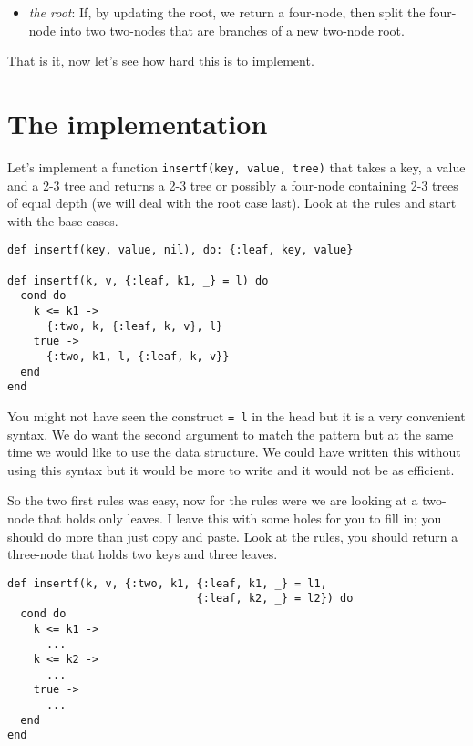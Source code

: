 \documentclass[a4paper,11pt]{article}
\begin{document}
\begin{itemize}
    \item {\em the root}: If, by updating the root, we return a four-node,
    then split the four-node into two two-nodes that are branches of a
    new two-node root.
\end{itemize}

That is it, now let's see how hard this is to implement.



\section{The implementation}

Let's implement a function {\tt insertf(key, value, tree)} that takes a
key, a value and a 2-3 tree and returns a 2-3 tree or possibly a
four-node containing 2-3 trees of equal depth (we will deal with the
root case last). Look at the rules and start with the base cases.

\begin{verbatim}
def insertf(key, value, nil), do: {:leaf, key, value}

def insertf(k, v, {:leaf, k1, _} = l) do
  cond do
    k <= k1 ->
      {:two, k, {:leaf, k, v}, l}
    true ->
      {:two, k1, l, {:leaf, k, v}}
  end
end
\end{verbatim}

You might not have seen the construct {\tt = l} in the head but it is a
very convenient syntax. We do want the second argument to match the
pattern but at the same time we would like to use the data
structure. We could have written this without using this syntax but it
would be more to write and it would not be as efficient.

So the two first rules was easy, now for the rules were we are looking
at a two-node that holds only leaves. I leave this with some holes for
you to fill in; you should do more than just copy and paste. Look at
the rules, you should return a three-node that holds two keys and
three leaves.

\begin{verbatim}
def insertf(k, v, {:two, k1, {:leaf, k1, _} = l1, 
                             {:leaf, k2, _} = l2}) do
  cond do
    k <= k1 ->
      ...
    k <= k2 ->
      ...
    true ->
      ...
  end
end
\end{verbatim}
\end{document}
